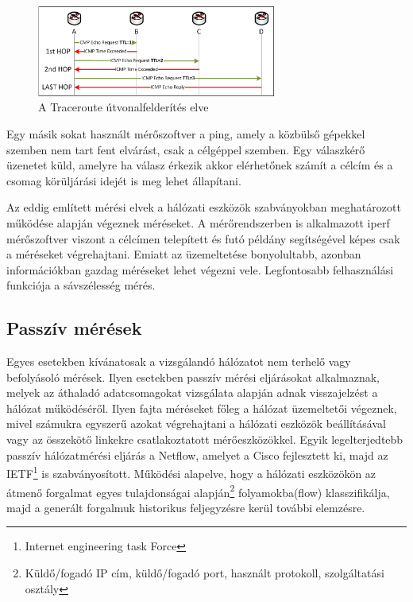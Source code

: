 \begin{figure}[h]
	\centering
	\includegraphics[width=0.7\textwidth, keepaspectratio]{figures/traceroute-works.png}
	\caption{A Traceroute útvonalfelderítés elve\protect\footnotemark}
	\label{fig:traceroute-works}
\end{figure}


Egy másik sokat használt mérőszoftver a ping, amely a közbülső gépekkel szemben nem tart fent elvárást, csak a célgéppel szemben. Egy válaszkérő üzenetet küld, amelyre ha válasz érkezik akkor elérhetőnek számít a célcím és a csomag körüljárási idejét is meg lehet állapítani.

Az eddig említett mérési elvek a hálózati eszközök szabványokban meghatározott működése alapján végeznek méréseket. A mérőrendszerben is alkalmazott iperf mérőszoftver viszont a célcímen telepített és futó példány segítségével képes csak a méréseket végrehajtani. Emiatt az üzemeltetése bonyolultabb, azonban információkban gazdag méréseket lehet végezni vele. Legfontosabb felhasználási funkciója a sávszélesség mérés.

\subsection{Passzív mérések}

Egyes esetekben kívánatosak a vizsgálandó hálózatot nem terhelő vagy befolyásoló mérések. Ilyen esetekben passzív mérési eljárásokat alkalmaznak, melyek az áthaladó adatcsomagokat vizsgálata alapján adnak visszajelzést a hálózat működéséről. Ilyen fajta méréseket főleg a hálózat üzemeltetői végeznek, mivel számukra egyszerű azokat végrehajtani a hálózati eszközök beállításával vagy az összekötő linkekre csatlakoztatott mérőeszközökkel. Egyik legelterjedtebb passzív hálózatmérési eljárás a Netflow, amelyet a Cisco fejlesztett ki, majd az IETF\footnote{Internet engineering task Force} is szabványosított. Működési alapelve, hogy a hálózati eszközökön az átmenő forgalmat egyes tulajdonságai alapján\footnote{Küldő/fogadó IP cím, küldő/fogadó port, használt protokoll, szolgáltatási osztály} folyamokba(flow) klasszifikálja, majd a generált forgalmuk historikus feljegyzésre kerül további elemzésre. 

